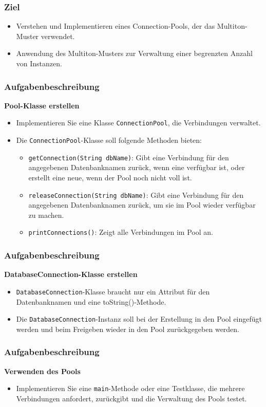 
\begin{frame}
  \titlepage
\end{frame}

\begin{frame}
  \frametitle{Ziel}
  \begin{itemize}
    \item Verstehen und Implementieren eines Connection-Pools, der das Multiton-Muster verwendet.
    \item Anwendung des Multiton-Musters zur Verwaltung einer begrenzten Anzahl von Instanzen.
  \end{itemize}
\end{frame}

\begin{frame}
  \frametitle{Aufgabenbeschreibung}
    \textbf{Pool-Klasse erstellen}
    \begin{itemize}
      \item Implementieren Sie eine Klasse \texttt{ConnectionPool}, die Verbindungen verwaltet.
      \item Die \texttt{ConnectionPool}-Klasse soll folgende Methoden bieten:
      \begin{itemize}
        \item \texttt{getConnection(String dbName)}: Gibt eine Verbindung für den angegebenen Datenbanknamen zurück, wenn eine verfügbar ist, oder erstellt eine neue, wenn der Pool noch nicht voll ist.
        \item \texttt{releaseConnection(String dbName)}: Gibt eine Verbindung für den angegebenen Datenbanknamen zurück, um sie im Pool wieder verfügbar zu machen.
        \item \texttt{printConnections()}: Zeigt alle Verbindungen im Pool an.
      \end{itemize}
    \end{itemize}
\end{frame}

\begin{frame}
  \frametitle{Aufgabenbeschreibung}
    \textbf{DatabaseConnection-Klasse erstellen}
    \begin{itemize}
     \item \texttt{DatabaseConnection}-Klasse braucht nur ein Attribut für den Datenbanknamen und eine toString()-Methode.
      \item Die \texttt{DatabaseConnection}-Instanz soll bei der Erstellung in den Pool eingefügt werden und beim Freigeben wieder in den Pool zurückgegeben werden.
      \end{itemize}
\end{frame}

\begin{frame}
  \frametitle{Aufgabenbeschreibung}
    \textbf{Verwenden des Pools}
    \begin{itemize}
      \item Implementieren Sie eine \texttt{main}-Methode oder eine Testklasse, die mehrere Verbindungen anfordert, zurückgibt und die Verwaltung des Pools testet.
    \end{itemize}
\end{frame}